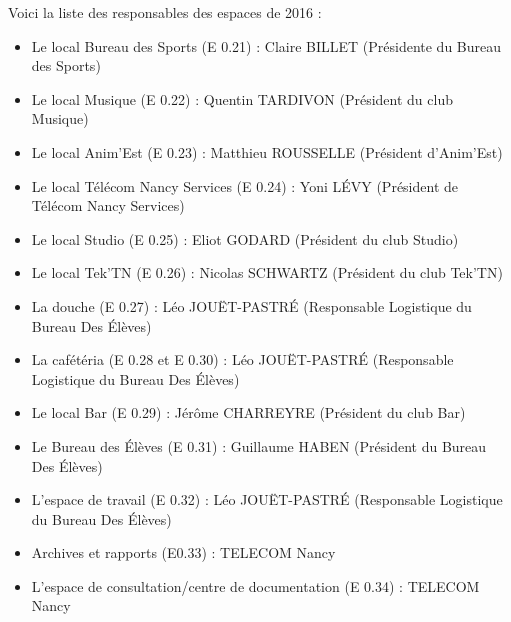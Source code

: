 \documentclass{article} %
\begin{document}
		Voici la liste des responsables des espaces de 2016 :
		\begin{itemize}
			\item Le local Bureau des Sports (E 0.21) : Claire BILLET
				(Présidente du Bureau des Sports)
			\item Le local Musique (E 0.22) : Quentin TARDIVON (Président du
				club Musique)
			\item Le local Anim’Est (E 0.23) : Matthieu ROUSSELLE (Président
				d’Anim’Est)
			\item Le local Télécom Nancy Services (E 0.24) : Yoni LÉVY
				(Président de Télécom Nancy Services)
			\item Le local Studio (E 0.25) : Eliot GODARD (Président du club
				Studio)
			\item Le local Tek’TN (E 0.26) : Nicolas SCHWARTZ (Président du
				club Tek’TN)
			\item La douche (E 0.27) : Léo JOUËT-PASTRÉ (Responsable
				Logistique du Bureau Des Élèves)
			\item La cafétéria (E 0.28 et E 0.30) : Léo JOUËT-PASTRÉ
				(Responsable Logistique du Bureau Des Élèves)
			\item Le local Bar (E 0.29) : Jérôme CHARREYRE (Président du club
				Bar)
			\item Le Bureau des Élèves (E 0.31) : Guillaume HABEN (Président du
				Bureau Des Élèves)
			\item L’espace de travail (E 0.32) : Léo JOUËT-PASTRÉ (Responsable
				Logistique du Bureau Des Élèves)
			\item Archives et rapports (E0.33) : TELECOM Nancy
			\item L'espace de consultation/centre de documentation (E 0.34) :
				TELECOM Nancy
		\end{itemize}
\end{document}
